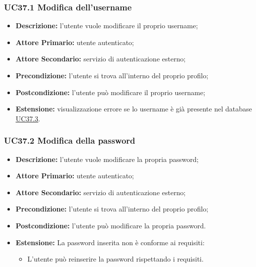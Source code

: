 \subsubsection{UC37.1 Modifica dell'username}
\label{sec:UC37.1}
\begin{itemize}
    \item \textbf{Descrizione:} l'utente vuole modificare il proprio username;
    \item \textbf{Attore Primario:} utente autenticato;
    \item \textbf{Attore Secondario:} servizio di autenticazione esterno;
    \item \textbf{Precondizione:} l'utente si trova all'interno del proprio profilo;
    \item \textbf{Postcondizione:} l'utente può modificare il proprio username;
    \item \textbf{Estensione:} visualizzazione errore se lo username è già presente nel database \underline{\hyperref[sec:UC37.3]{UC37.3}}.
\end{itemize}

\subsubsection{UC37.2 Modifica della password}
\label{sec:UC37.2}
\begin{itemize}
    \item \textbf{Descrizione:} l'utente vuole modificare la propria password;
    \item \textbf{Attore Primario:} utente autenticato;
    \item \textbf{Attore Secondario:} servizio di autenticazione esterno;
    \item \textbf{Precondizione:} l'utente si trova all'interno del proprio profilo;
    \item \textbf{Postcondizione:} l'utente può modificare la propria password.
    \item \textbf{Estensione:} La password inserita non è conforme ai requisiti:
          \begin{itemize}
              \item L'utente può reinserire la password rispettando i requisiti.
          \end{itemize}
\end{itemize}
